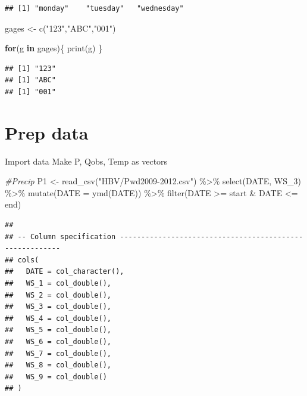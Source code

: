 \documentclass[
]{book}
\newenvironment{Shaded}{\begin{snugshade}}{\end{snugshade}}
\newcommand{\AttributeTok}[1]{\textcolor[rgb]{0.77,0.63,0.00}{#1}}
\newcommand{\CommentTok}[1]{\textcolor[rgb]{0.56,0.35,0.01}{\textit{#1}}}
\newcommand{\ControlFlowTok}[1]{\textcolor[rgb]{0.13,0.29,0.53}{\textbf{#1}}}
\newcommand{\FunctionTok}[1]{\textcolor[rgb]{0.00,0.00,0.00}{#1}}
\newcommand{\NormalTok}[1]{#1}
\newcommand{\OtherTok}[1]{\textcolor[rgb]{0.56,0.35,0.01}{#1}}
\newcommand{\SpecialCharTok}[1]{\textcolor[rgb]{0.00,0.00,0.00}{#1}}
\newcommand{\StringTok}[1]{\textcolor[rgb]{0.31,0.60,0.02}{#1}}
\begin{document}
\begin{verbatim}
## [1] "monday"    "tuesday"   "wednesday"
\end{verbatim}

\begin{Shaded}
\begin{Highlighting}[]
\NormalTok{gages }\OtherTok{\textless{}{-}} \FunctionTok{c}\NormalTok{(}\StringTok{"123"}\NormalTok{,}\StringTok{"ABC"}\NormalTok{,}\StringTok{"001"}\NormalTok{)}

\ControlFlowTok{for}\NormalTok{(g }\ControlFlowTok{in}\NormalTok{ gages)\{}
  \FunctionTok{print}\NormalTok{(g)}
\NormalTok{\}}
\end{Highlighting}
\end{Shaded}

\begin{verbatim}
## [1] "123"
## [1] "ABC"
## [1] "001"
\end{verbatim}

\hypertarget{prep-data}{%
\section{Prep data}\label{prep-data}}

Import data
Make P, Qobs, Temp as vectors

\begin{Shaded}
\begin{Highlighting}[]
\CommentTok{\#Precip}
\NormalTok{P1 }\OtherTok{\textless{}{-}} \FunctionTok{read\_csv}\NormalTok{(}\StringTok{"HBV/Pwd2009{-}2012.csv"}\NormalTok{) }\SpecialCharTok{\%\textgreater{}\%} 
         \FunctionTok{select}\NormalTok{(DATE, WS\_3) }\SpecialCharTok{\%\textgreater{}\%}
         \FunctionTok{mutate}\NormalTok{(}\AttributeTok{DATE =} \FunctionTok{ymd}\NormalTok{(DATE)) }\SpecialCharTok{\%\textgreater{}\%}
         \FunctionTok{filter}\NormalTok{(DATE }\SpecialCharTok{\textgreater{}=}\NormalTok{ start }\SpecialCharTok{\&}\NormalTok{ DATE }\SpecialCharTok{\textless{}=}\NormalTok{ end)}
\end{Highlighting}
\end{Shaded}

\begin{verbatim}
## 
## -- Column specification --------------------------------------------------------
## cols(
##   DATE = col_character(),
##   WS_1 = col_double(),
##   WS_2 = col_double(),
##   WS_3 = col_double(),
##   WS_4 = col_double(),
##   WS_5 = col_double(),
##   WS_6 = col_double(),
##   WS_7 = col_double(),
##   WS_8 = col_double(),
##   WS_9 = col_double()
## )
\end{verbatim}
\end{document}
